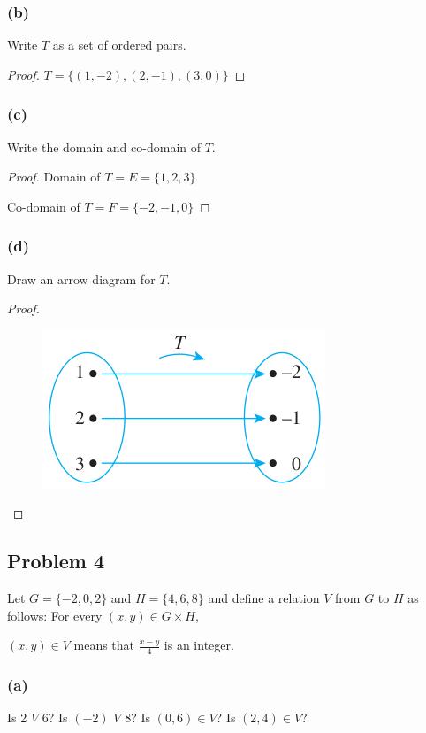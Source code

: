 \documentclass[14pt]{extarticle}
\newcommand{\dps}{\displaystyle}
\begin{document}
\subsubsection{(b)}
Write $T$ as a set of ordered pairs.

\begin{proof}
$T = \{(1, -2), (2, -1), (3, 0)\}$
\end{proof}

\subsubsection{(c)}
Write the domain and co-domain of $T$.

\begin{proof}
Domain of $T = E = \{1, 2, 3\}$

Co-domain of $T = F = \{-2, -1, 0\}$
\end{proof}

\subsubsection{(d)}
Draw an arrow diagram for $T$.

\begin{proof}
\begin{figure}[ht!]
\centering
\includegraphics[scale=0.5]{../images/1.3.3.png}
\end{figure}
\end{proof}

\subsection{Problem 4}
Let $G = \{-2, 0, 2\}$ and $H = \{4, 6, 8\}$ and define a relation $V$ from
$G$ to $H$ as follows: For every $(x, y) \in G \times H$,

\begin{center}
$(x, y) \in V$ means that $\dps\frac{x-y}{4}$ is an integer.
\end{center}

\subsubsection{(a)}
Is 2 $V$ 6? Is $(-2)$ $V$ 8? Is $(0, 6) \in V$? Is $(2, 4) \in V$?
\end{document}
